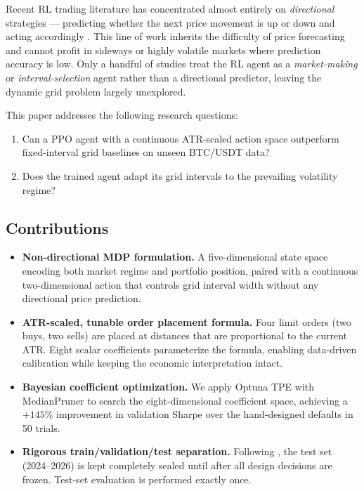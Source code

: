 \documentclass[11pt, a4paper]{article}
\begin{document}
Recent RL trading literature has concentrated almost entirely on \emph{directional}
strategies — predicting whether the next price movement is up or down and acting
accordingly \citep{liu2021bitcoin, yasin2024rl, pham2025dqn}.
This line of work inherits the difficulty of price forecasting and cannot profit in
sideways or highly volatile markets where prediction accuracy is low.
Only a handful of studies treat the RL agent as a \emph{market-making} or
\emph{interval-selection} agent rather than a directional predictor, leaving the
dynamic grid problem largely unexplored.

This paper addresses the following research questions:

\begin{enumerate}[label=\textbf{RQ\arabic*:}]
    \item Can a PPO agent with a continuous ATR-scaled action space outperform
          fixed-interval grid baselines on unseen BTC/USDT data?
    \item Does the trained agent adapt its grid intervals to the prevailing
          volatility regime?
\end{enumerate}

\subsection*{Contributions}

\begin{itemize}
    \item \textbf{Non-directional MDP formulation.}
          A five-dimensional state space encoding both market regime and portfolio
          position, paired with a continuous two-dimensional action that controls
          grid interval width without any directional price prediction.

    \item \textbf{ATR-scaled, tunable order placement formula.}
          Four limit orders (two buys, two sells) are placed at distances that
          are proportional to the current ATR.
          Eight scalar coefficients parameterize the formula, enabling
          data-driven calibration while keeping the economic interpretation intact.

    \item \textbf{Bayesian coefficient optimization.}
          We apply Optuna TPE with MedianPruner to search the eight-dimensional
          coefficient space, achieving a $+145\%$ improvement in validation Sharpe
          over the hand-designed defaults in 50 trials.

    \item \textbf{Rigorous train/validation/test separation.}
          Following \citet{gort2022backtest}, the test set (2024--2026) is kept
          completely sealed until after all design decisions are frozen.
          Test-set evaluation is performed exactly once.
\end{itemize}
\end{document}
